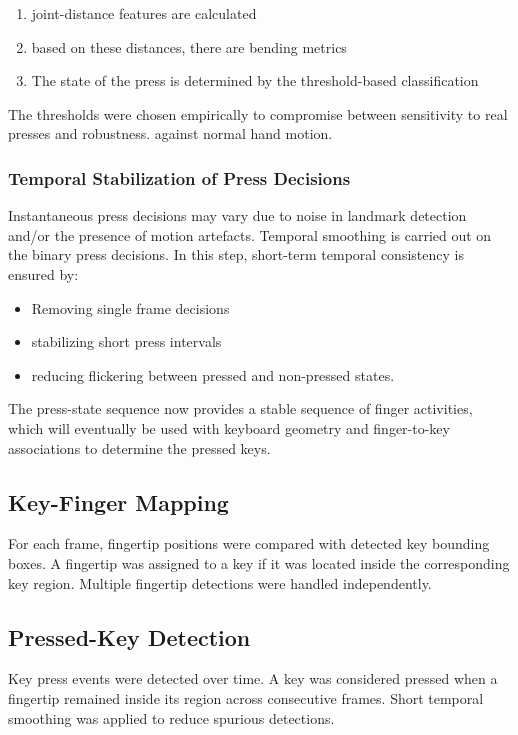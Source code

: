 \begin{enumerate}
\item joint-distance features are calculated
\item based on these distances, there are bending metrics
\item The state of the press is determined by the threshold-based classification
\end{enumerate}

The thresholds were chosen empirically to compromise between sensitivity to real presses and robustness. against normal hand motion.

\subsubsection{Temporal Stabilization of Press Decisions}
\label{subsec:temporal_stabilization}

Instantaneous press decisions may vary due to noise in landmark detection and/or the presence of motion artefacts. Temporal smoothing is carried out on the binary press decisions. In this step, short-term temporal consistency is ensured by:

\begin{itemize}
\item Removing single frame decisions
\item stabilizing short press intervals
\item reducing flickering between pressed and non-pressed states.
\end{itemize}

The press-state sequence now provides a stable sequence of finger activities, which will eventually be used with keyboard geometry and finger-to-key associations to determine the pressed keys.

\subsection{Key-Finger Mapping}

For each frame, fingertip positions were compared
with detected key bounding boxes.
A fingertip was assigned to a key
if it was located inside the corresponding key region.
Multiple fingertip detections were handled independently.

\subsection{Pressed-Key Detection}

Key press events were detected over time.
A key was considered pressed when a fingertip
remained inside its region across consecutive frames.
Short temporal smoothing was applied
to reduce spurious detections.
